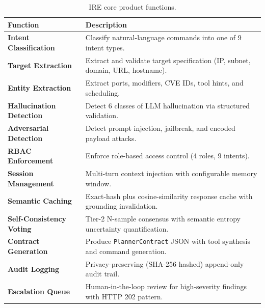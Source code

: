 \documentclass[10pt,journal,onecolumn]{IEEEtran}
\begin{document}
\begin{table}[t]
\caption{IRE core product functions.}
\label{tab:functions}
\begin{tabularx}{\textwidth}{l X}
\toprule
\textbf{Function} & \textbf{Description}\\
\midrule
\textbf{Intent Classification} & Classify natural-language commands into one of 9 intent types.\\
\textbf{Target Extraction} & Extract and validate target specification (IP, subnet, domain, URL, hostname).\\
\textbf{Entity Extraction} & Extract ports, modifiers, CVE IDs, tool hints, and scheduling.\\
\textbf{Hallucination Detection} & Detect 6 classes of LLM hallucination via structured validation.\\
\textbf{Adversarial Detection} & Detect prompt injection, jailbreak, and encoded payload attacks.\\
\textbf{RBAC Enforcement} & Enforce role-based access control (4 roles, 9 intents).\\
\textbf{Session Management} & Multi-turn context injection with configurable memory window.\\
\textbf{Semantic Caching} & Exact-hash plus cosine-similarity response cache with grounding invalidation.\\
\textbf{Self-Consistency Voting} & Tier-2 N-sample consensus with semantic entropy uncertainty quantification.\\
\textbf{Contract Generation} & Produce \texttt{PlannerContract} JSON with tool synthesis and command generation.\\
\textbf{Audit Logging} & Privacy-preserving (SHA-256 hashed) append-only audit trail.\\
\textbf{Escalation Queue} & Human-in-the-loop review for high-severity findings with HTTP 202 pattern.\\
\bottomrule
\end{tabularx}
\end{table}
\end{document}
